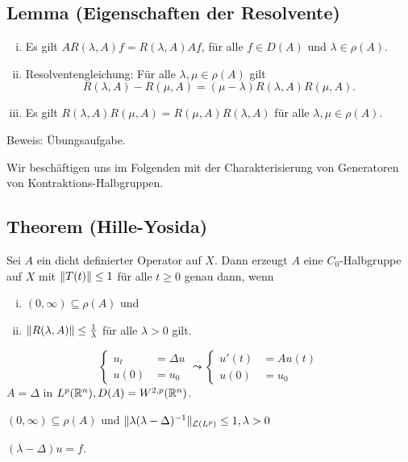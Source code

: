 \subsection{Lemma (Eigenschaften der Resolvente)}

\begin{enumerate}[i)]
  \item Es gilt $A R(\lambda, A) f = R(\lambda, A) A f$, für alle $f \in D(A)$ und $\lambda \in \rho(A)$.
  \item Resolventengleichung: Für alle $\lambda, \mu \in \rho(A)$ gilt 
  $$
  R(\lambda, A) - R(\mu, A) = (\mu - \lambda) R(\lambda, A) R(\mu, A).
  $$
  \item Es gilt $R(\lambda, A) R(\mu, A) = R(\mu, A) R(\lambda, A)$ für alle $\lambda, \mu \in \rho(A)$. 
\end{enumerate}

Beweis: Übungsaufgabe.

Wir beschäftigen uns im Folgenden mit der Charakterisierung von Generatoren von Kontraktions-Halbgruppen.

\subsection{Theorem (Hille-Yosida)}

Sei $A$ ein dicht definierter Operator auf $X$.
Dann erzeugt $A$ eine $C_0$-Halbgruppe auf $X$ mit $\lVert T(t) \rVert \leq 1$ für alle $t \geq 0$ genau dann, wenn
\begin{enumerate}[i)]
  \item $(0, \infty) \subseteq \rho(A)$ und
  \item $\lVert R(\lambda, A) \rVert \leq \frac{1}{\lambda}$ für alle $\lambda > 0$ gilt.
\end{enumerate}

\begin{bem}
  $$
  \begin{cases} u_t &= \Delta u \\ u(0) &= u_0 \end{cases} \leadsto 
  \begin{cases} u'(t) &= A u(t) \\ u(0) &= u_0 \end{cases}
  $$
  $ A = \Delta $ in $ L^p(\mathbb{R}^n), D(A) = W^{2,p}(\mathbb{R}^n) $.
 
  $(0,\infty) \subseteq \rho(A)$ und $\lVert \lambda (\lambda - \Delta)^{-1} \rVert_{\mathcal{L}(L^p)} \leq 1, \lambda > 0$

  $(\lambda - \Delta) u = f$.
\end{bem}

